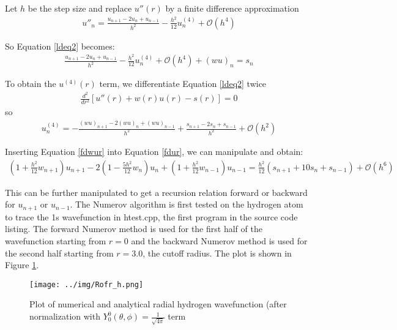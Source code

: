 \documentclass[11pt,letterpaper]{article}
\begin{document}
Let $h$ be the step size and 
replace $u''(r)$ by a finite difference approximation \cite[p.~50]{koonin90}
\begin{align}
u''_n =
\frac{u_{n+1} - 2u_{n} + u_{n-1}}{h^2}
- \frac{h^2}{12}u^{(4)}_n + \mathcal{O}(h^4)
\end{align}

So Equation \eqref{ldeq2} becomes:
\begin{align}
\frac{u_{n+1} - 2u_{n} + u_{n-1}}{h^2}
- \frac{h^2}{12}u^{(4)}_n + \mathcal{O}(h^4) + (wu)_n = s_n
\label{fdur}
\end{align}

To obtain the $u^{(4)}(r)$ term, we differentiate Equation \eqref{ldeq2}
twice
\begin{align}
\frac{d^2}{dr^2}\left[u''(r) + w(r)u(r) - s(r) \right] = 0 
\end{align}
so
\begin{align}
u^{(4)}_n =  -\frac{(wu)_{n+1} - 2(wu)_{n} + (wu)_{n-1}}{h^2}
            +\frac{s_{n+1}-2s_n+s_{n-1}}{h^2}
            + \mathcal{O}(h^2)
\label{fdwur}
\end{align}

Inserting Equation \eqref{fdwur} into Equation \eqref{fdur}, we
can manipulate and obtain:
\begin{multline}
\left(1+ \frac{h^2}{12}w_{n+1}\right)u_{n+1} 
- 2\left(1- \frac{5h^2}{12}w_n\right)u_n
+ \left(1+ \frac{h^2}{12}w_{n-1}\right)u_{n-1}  
= \frac{h^2}{12}\left(s_{n+1}+10s_n+s_{n-1}\right) + \mathcal{O}(h^6)
\end{multline}

This can be further manipulated to get a recursion relation forward or backward
for $u_{n+1}$ or $u_{n-1}$.
The Numerov algorithm is first tested on the hydrogen atom to trace
the 1s wavefunction in htest.cpp, the first program in the source
code listing. The forward Numerov
method is used for the first half of the wavefunction starting
from $r = 0$ and
the backward Numerov method is used for the second half starting from
$r = 3.0$, the cutoff radius.
The plot is shown in Figure \ref{Rofrh}.
\begin{figure}[htb!]
\begin{center}
\texttt{[image: ../img/Rofr\_h.png]}
\end{center}
\caption{Plot of numerical and analytical radial hydrogen wavefunction 
(after normalization with $Y_0^0(\theta,\phi) = \frac{1}{\sqrt{4\pi}}$ term
\label{Rofrh}}
\end{figure}
\end{document}
